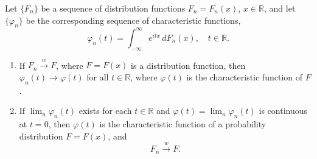 Let $\{F_n\}$ be a sequence of distribution functions $F_n = F_n(x)$, $x \in \mathbb{R}$, and let $\{\varphi_n\}$ be the corresponding sequence of characteristic functions,
$$\varphi_n(t) = \int_{-\infty}^{\infty} e^{itx} \, dF_n(x), \quad t \in \mathbb{R}.$$

\begin{enumerate}
\item[(1)] If $F_n \xrightarrow{w} F$, where $F = F(x)$ is a distribution function, then $\varphi_n(t) \to \varphi(t)$ for all $t \in \mathbb{R}$, where $\varphi(t)$ is the characteristic function of $F$.

\item[(2)] If $\lim_n \varphi_n(t)$ exists for each $t \in \mathbb{R}$ and $\varphi(t) = \lim_n \varphi_n(t)$ is continuous at $t = 0$, then $\varphi(t)$ is the characteristic function of a probability distribution $F = F(x)$, and
$$F_n \xrightarrow{w} F.$$
\end{enumerate}
